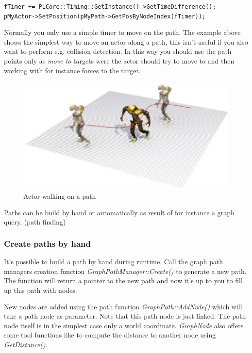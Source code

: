 \begin{lstlisting}[caption=Moving along path]
fTimer += PLCore::Timing::GetInstance()->GetTimeDifference();
pMyActor->SetPosition(pMyPath->GetPosByNodeIndex(fTimer));
\end{lstlisting}

Normally you only use a simple timer to move on the path. The example above shows the simplest way to move an actor along a path, this isn't useful if you also want to perform e.g. collision detection. In this way you should use the path points only as \emph{move to} targets were the actor should try to move to and then working with for instance forces to the target.

\begin{figure}
  \begin{center}
    \includegraphics{pics/Paths.eps}
  \end{center}
  \caption{Actor walking on a path}
  \label{fig:Actor walking on a path}
\end{figure}

Paths can be build by hand or automatically as result of for instance a graph query. (path finding)



\subsubsection{Create paths by hand}
It's possible to build a path by hand during runtime. Call the graph path managers creation function \emph{GraphPathManager::Create()} to generate a new path. The function will return a pointer to the new path and now it's up to you to fill up this path with nodes.

New nodes are added using the path function \emph{GraphPath::AddNode()} which will take a path node as parameter. Note that this path node is just linked. The path node itself is in the simplest case only a world coordinate. \emph{GraphNode} also offers some tool functions like to compute the distance to another node using \emph{GetDistance()}.

